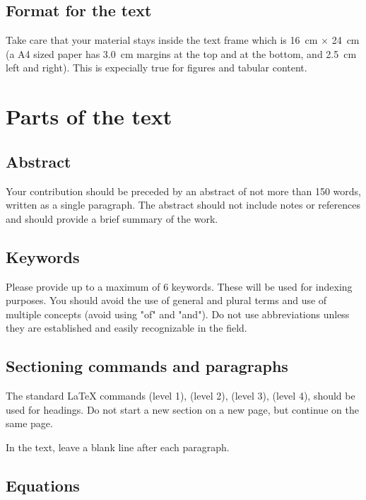 \documentclass{cernrep}
\begin{document}
\subsection{Format for the text}
 
Take care that your material stays inside the text frame which is
16~cm $\times$ 24~cm (\ie a A4 sized paper has 3.0~cm margins at the
top and at the bottom, and 2.5~cm left and right). This is expecially
true for figures and tabular content.

\section{Parts of the text}

\subsection{Abstract}

Your contribution should be preceded by an abstract of not more than
150 words, written as a single paragraph. The abstract should not include notes or references and should provide a brief summary of the work.

\subsection{Keywords}
Please provide up to a maximum of 6 keywords. These will be used for indexing purposes. You should avoid the use of general and plural terms and use of multiple concepts (avoid using "of" and "and"). Do not use abbreviations unless they are established and easily recognizable in the field.

\subsection{Sectioning commands and paragraphs}
\label{sec:sections}

The standard \LaTeX{} commands  (level 1),
 (level 2),  (level 3),
 (level 4), should be used for headings.  Do not
start a new section on a new page, but continue on the same page.

In the text, leave a blank line after each paragraph.

\subsection{Equations}
\label{sec:equations}
\end{document}
